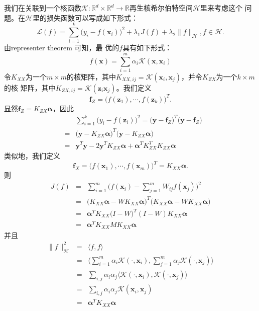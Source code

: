 我们在关联到一个核函数$\mathcal{K}: \mathbb{R}^d\times \mathbb{R}^d
\rightarrow \mathbb{R}$再生核希尔伯特空间$\mathcal{H}$里来考虑这个
问题。在$\mathcal{H}$里的损失函数可以写成如下形式：
\begin{equation}
\label{eqn:rkhs-obj}
 \mathcal{L}(f)= \sum_{i=1}^k \big( y_i - f(\mathbf{x}_i) \big)^2 +
 \lambda_1 J(f) + \lambda_2 \|f\|_{\mathcal{H}}, f \in \mathcal{H}.
\end{equation}
由representer theorem
\cite{Learning-with-Kernels,Manifold-Regularization-Journal}可知，最
优的$f$具有如下形式：
\begin{equation}
\label{eqn:representer-theorem} f(\textbf{x})=\sum_{i=1}^m \alpha_i
\mathcal{K}(\textbf{x}, \textbf{x}_i)
\end{equation}
令$K_{XX}$为一个$m\times m$的核矩阵，其中$K_{XX,ij}=\mathcal{K}
(\textbf{x}_i, \textbf{x}_j)$，并令$K_{ZX}$为一个$k \times m$的核
矩阵，其中$K_{ZX,ij}=\mathcal{K}(\mathbf{z}_i\mathbf{x}_j)$。我们定义
$$
\textbf{f}_Z=\big( f(\textbf{z}_1), \cdots, f(\textbf{z}_k) \big)^T.
$$
显然$\textbf{f}_Z = K_{ZX} \pmb{\alpha}$，因此
\begin{eqnarray*}
&&\sum_{i=1}^k \big( y_i - f(\textbf{z}_i) \big)^2 = \big(
\textbf{y}
- \textbf{f}_Z \big)^T \big( \textbf{y} - \textbf{f}_Z \big)\\
&=&\big( \textbf{y} - K_{ZX} \pmb{\alpha} \big)^T \big( \textbf{y} -
K_{ZX} \pmb{\alpha} \big)\\
&=&\textbf{y}^T \textbf{y} - 2 \textbf{y}^T K_{ZX} \pmb{\alpha} +
\pmb{\alpha}^T K_{ZX}^T K_{ZX} \pmb{\alpha}
\end{eqnarray*}
类似地，我们定义
$$
\textbf{f}_X=\big( f(\textbf{x}_1), \cdots, f(\textbf{x}_m) \big)^T
= K_{XX} \pmb{\alpha}.
$$
则
\begin{eqnarray*}
J(f)&=&\sum_{i=1}^{m} \Big( f(\mathbf{x}_i) - \sum_{j=1}^{m} W_{ij}
f(\mathbf{x}_j) \Big)^2 \\
&=& \big( K_{XX} \pmb{\alpha} - W K_{XX} \pmb{\alpha} \big)^T \big(
K_{XX} \pmb{\alpha} - W K_{XX} \pmb{\alpha} \big) \\
&=& \pmb{\alpha}^T K_{XX} \big(I-W)^T(I-W) K_{XX} \pmb{\alpha}\\
&=& \pmb{\alpha}^T K_{XX} M K_{XX} \pmb{\alpha}
\end{eqnarray*}
并且
\begin{eqnarray*}
\|f\|^2_{\mathcal{H}}&=&\langle f, f \rangle \\
&=& \langle \sum_{i=1}^m \alpha_i \mathcal{K}(\cdot, \textbf{x}_i),
\sum_{j=1}^m \alpha_j \mathcal{K}(\cdot,
\textbf{x}_j) \rangle \\
&=& \sum_{i,j} \alpha_i \alpha_j \langle \mathcal{K}(\cdot,
\textbf{x}_i), \mathcal{K}(\cdot, \textbf{x}_j) \rangle \\
&=& \sum_{i,j} \alpha_i \alpha_j \mathcal{K} (\textbf{x}_i,
\textbf{x}_j)\\
&=& \pmb{\alpha}^T K_{XX} \pmb{\alpha}
\end{eqnarray*}
